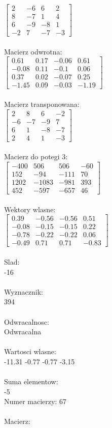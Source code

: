 \documentclass[a4paper,12pt]{article}
\begin{document}
$\begin{bmatrix} 2&-6&6&2\\8&-7&1&4\\6&-9&-8&1\\-2&7&-7&-3 \end{bmatrix}$
\\
\\
Macierz odwrotna:\\

$\begin{bmatrix} 0.61&0.17&-0.06&0.61\\-0.08&0.11&-0.1&0.06\\0.37&0.02&-0.07&0.25\\-1.45&0.09&-0.03&-1.19 \end{bmatrix}$
\\
\\
Macierz transponowana:\\

$\begin{bmatrix} 2&8&6&-2\\-6&-7&-9&7\\6&1&-8&-7\\2&4&1&-3 \end{bmatrix}$
\\
\\
Macierz do potegi 3:\\

$\begin{bmatrix} -400&506&506&-60\\152&-94&-111&70\\1202&-1083&-981&393\\452&-597&-657&46 \end{bmatrix}$
\\
\\
Wektory wlasne:\\

$\begin{bmatrix} 0.39&-0.56&-0.56&0.51\\-0.08&-0.15&-0.15&0.22\\-0.78&-0.22&-0.22&0.06\\-0.49&0.71&0.71&-0.83 \end{bmatrix}$
\\
\\
Slad:\\
-16
\\
\\
Wyznacznik:\\
394
\\
\\
Odwracalnosc:\\
Odwracalna
\\
\\
Wartosci wlasne:\\
-11.31 -0.77 -0.77 -3.15
\\
\\
Suma elementow:\\
-5
\\
\newpage
Numer macierzy:
67
\\
\\
Macierz:\\
\end{document}

